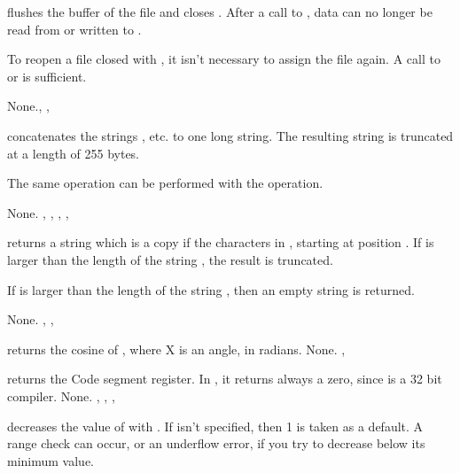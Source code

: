 \documentclass{report}
\begin{document}


{ flushes the buffer of the file  and closes .
After a call to , data can no longer be read from or written to
.

To reopen a file closed with , it isn't necessary to assign the
file again. A call to  or  is sufficient.}
{None.}{, , }



{ concatenates the strings , etc. to one long
string. The resulting string is truncated at a length of 255 bytes.

The same operation can be performed with the \var{+} operation.}
{None.}
{, , , , }



{ returns a string which is a copy if the  characters
in , starting at position . If  is larger than
the length of the string , the result is truncated. 

If  is larger than the length of the string , then an
empty string is returned.}
{None.}
{, , }



{ returns the cosine of , where X is an angle, in radians.}
{None.}
{, }



{ returns the Code segment register. In \fpc, it returns always a
zero, since \fpc is a 32 bit compiler.}
{None.}
{, , , }



{ decreases the value of  with .
If  isn't specified, then 1 is taken as a default.}
{A range check can occur, or an underflow error, if you try to decrease 
below its minimum value.}
{}


\end{document}
